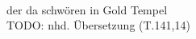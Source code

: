 \begin{exe}
\ex \label{ex:T28605} \gll {}       \\
{der} {da} {schwören} {in} {Gold} {Tempel}  {}\\
\glt TODO: nhd. Übersetzung (T.141,14)
\end{exe}
